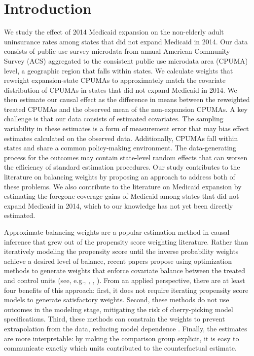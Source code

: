 \documentclass[aoas]{imsart}
\theoremstyle{plain}
\theoremstyle{remark}
\begin{document}
\section{Introduction}

We study the effect of 2014 Medicaid expansion on the non-elderly adult uninsurance rates among states that did not expand Medicaid in 2014. Our data consists of public-use survey microdata from annual American Community Survey (ACS) aggregated to the consistent public use microdata area (CPUMA) level, a geographic region that falls within states. We calculate weights that reweight expansion-state CPUMAs to approximately match the covariate distribution of CPUMAs in states that did not expand Medicaid in 2014. We then estimate our causal effect as the difference in means between the reweighted treated CPUMAs and the observed mean of the non-expansion CPUMAs. A key challenge is that our data consists of estimated covariates. The sampling variability in these estimates is a form of measurement error that may bias effect estimates calculated on the observed data. Additionally, CPUMAs fall within states and share a common policy-making environment. The data-generating process for the outcomes may contain state-level random effects that can worsen the efficiency of standard estimation procedures. Our study contributes to the literature on balancing weights by proposing an approach to address both of these problems. We also contribute to the literature on Medicaid expansion by estimating the foregone coverage gains of Medicaid among states that did not expand Medicaid in 2014, which to our knowledge has not yet been directly estimated.

Approximate balancing weights are a popular estimation method in causal inference that grew out of the propensity score weighting literature. Rather than iteratively modeling the propensity score until the inverse probability weights achieve a desired level of balance, recent papers propose using optimization methods to generate weights that enforce covariate balance between the treated and control units (see, e.g., \cite{hainmueller2012entropy}, \cite{imai2014covariate}, \cite{zubizarreta2015stable}). From an applied perspective, there are at least four benefits of this approach: first, it does not require iterating propensity score models to generate satisfactory weights. Second, these methods do not use outcomes in the modeling stage, mitigating the risk of cherry-picking model specifications. Third, these methods can constrain the weights to prevent extrapolation from the data, reducing model dependence \cite{zubizarreta2015stable}. Finally, the estimates are more interpretable: by making the comparison group explicit, it is easy to communicate exactly which units contributed to the counterfactual estimate.
\end{document}
